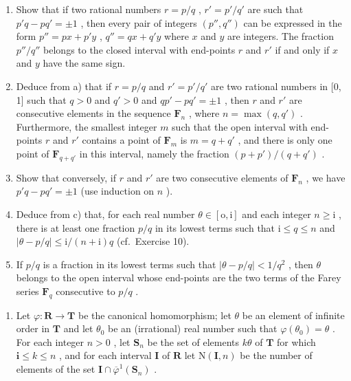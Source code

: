 \begin{enumerate}
\def\labelenumi{\alph{enumi})}
\item
  Show that if two rational numbers \(r = p / q\) , \(r' = p' / q'\) are such that \(p'q - pq' = \pm 1\) , then every pair of integers \((p'', q'')\) can be expressed in the form \(p'' = px + p'y\) , \(q'' = qx + q'y\) where \(x\) and \(y\) are integers. The fraction \(p'' / q''\) belongs to the closed interval with end-points \(r\) and \(r'\) if and only if \(x\) and \(y\) have the same sign.
\item
  Deduce from a) that if \(r = p / q\) and \(r' = p' / q'\) are two rational numbers in {[}0, 1{]} such that \(q > 0\) and \(q' > 0\) and \(qp' - pq' = \pm 1\) , then \(r\) and \(r'\) are consecutive elements in the sequence \(\mathbf{F}_n\) , where \(n = \max (q, q')\) . Furthermore, the smallest integer \(m\) such that the open interval with end-points \(r\) and \(r'\) contains a point of \(\mathbf{F}_m\) is \(m = q + q'\) , and there is only one point of \(\mathbf{F}_{q + q'}\) in this interval, namely the fraction \((p + p') / (q + q')\) .
\item
  Show that conversely, if \(r\) and \(r'\) are two consecutive elements of \(\mathbf{F}_n\) , we have \(p'q - pq' = \pm 1\) (use induction on \(n\) ).
\item
  Deduce from c) that, for each real number \(\theta \in [\mathrm{o},\mathrm{i}]\) and each integer \(n\geqslant \mathrm{i}\) , there is at least one fraction \(p / q\) in its lowest terms such that \(\mathrm{i}\leqslant q\leqslant n\) and \(|\theta -p / q|\leqslant \mathrm{i} / (n + \mathrm{i})q\) (cf.~Exercise 10).
\item
  If \(p / q\) is a fraction in its lowest terms such that \(|\theta - p / q| < 1 / q^2\) , then \(\theta\) belongs to the open interval whose end-points are the two terms of the Farey series \(\mathbf{F}_q\) consecutive to \(p / q\) .
\end{enumerate}

\begin{enumerate}
\def\labelenumi{\arabic{enumi})}
\setcounter{enumi}{13}
\tightlist
\item
  Let \(\varphi: \mathbf{R} \to \mathbf{T}\) be the canonical homomorphism; let \(\theta\) be an element of infinite order in \(\mathbf{T}\) and let \(\theta_0\) be an (irrational) real number such that \(\varphi(\theta_0) = \theta\) . For each integer \(n > 0\) , let \(\mathbf{S}_n\) be the set of elements \(k\theta\) of \(\mathbf{T}\) for which \(\mathbf{i} \leqslant k \leqslant n\) , and for each interval \(\mathbf{I}\) of \(\mathbf{R}\) let \(\mathrm{N}(\mathbf{I}, n)\) be the number of elements of the set \(\mathbf{I} \cap \overline{\varphi}^1(\mathbf{S}_n)\) .
\end{enumerate}

